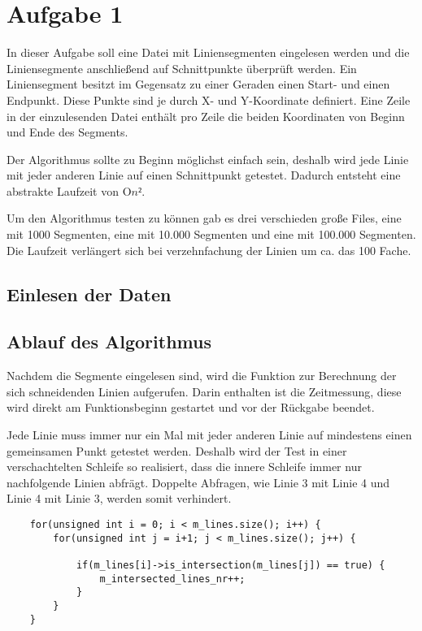 \section{Aufgabe 1}
\label{sec:Aufgabe1}
In dieser Aufgabe soll eine Datei mit Liniensegmenten eingelesen werden und die Liniensegmente anschlie{\ss}end auf Schnittpunkte überprüft werden. Ein Liniensegment besitzt im Gegensatz zu einer Geraden einen Start- und einen Endpunkt. Diese Punkte sind je durch X- und Y-Koordinate definiert. Eine Zeile in der einzulesenden Datei enthält pro Zeile die beiden Koordinaten von Beginn und Ende des Segments.

Der Algorithmus sollte zu Beginn möglichst einfach sein, deshalb wird jede Linie mit jeder anderen Linie auf einen Schnittpunkt getestet. Dadurch entsteht eine abstrakte Laufzeit von O\(n²\).

Um den Algorithmus testen zu können gab es drei verschieden gro{\ss}e Files, eine mit 1000 Segmenten, eine mit 10.000 Segmenten und eine mit 100.000 Segmenten. Die Laufzeit verlängert sich bei verzehnfachung der Linien um ca. das 100 Fache.

\subsection{Einlesen der Daten}
\label{subsec:A1_EinlesenDaten}




\subsection{Ablauf des Algorithmus}
\label{subsec:A1_Algorithmus}
Nachdem die Segmente eingelesen sind, wird die Funktion zur Berechnung der sich schneidenden Linien aufgerufen. Darin enthalten ist die Zeitmessung, diese wird direkt am Funktionsbeginn gestartet und vor der Rückgabe beendet. 

Jede Linie muss immer nur ein Mal mit jeder anderen Linie auf mindestens einen gemeinsamen Punkt getestet werden. Deshalb wird der Test in einer verschachtelten Schleife so realisiert, dass die innere Schleife immer nur nachfolgende Linien abfrägt. Doppelte Abfragen, wie Linie 3 mit Linie 4 und Linie 4 mit Linie 3, werden somit verhindert.

\begin{lstlisting}
	for(unsigned int i = 0; i < m_lines.size(); i++) {
		for(unsigned int j = i+1; j < m_lines.size(); j++) {

			if(m_lines[i]->is_intersection(m_lines[j]) == true) {
				m_intersected_lines_nr++;
			}
		}
	}
\end{lstlisting}

